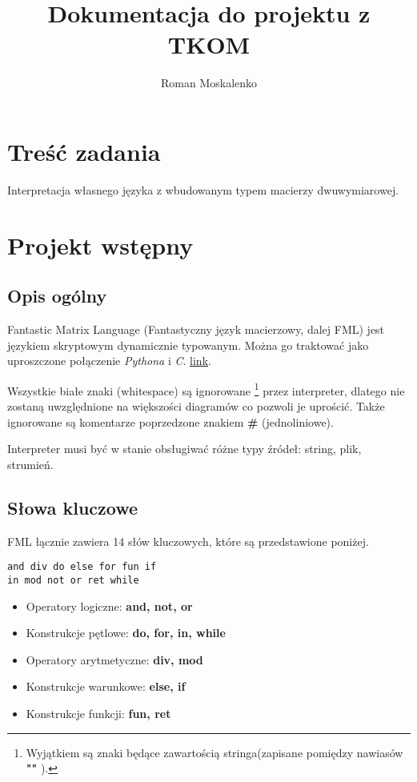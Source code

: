 \documentclass[12pt,a4paper]{article}
\title{Dokumentacja do projektu z TKOM}
\author{Roman Moskalenko}
\date{}
\begin{document}
\maketitle
\tableofcontents
\pagebreak

\section{Treść zadania}
Interpretacja własnego języka z wbudowanym typem macierzy dwuwymiarowej.

\section{Projekt wstępny}
\subsection{Opis ogólny}

Fantastic Matrix Language (Fantastyczny język macierzowy, dalej FML) jest językiem skryptowym dynamicznie typowanym. Można go traktować jako uproszczone połączenie \emph{Pythona} i \emph{C}. \hyperlink{foo}{\hypertarget{foo_back}{link}}.

Wszystkie białe znaki (whitespace) są ignorowane
\footnote{Wyjątkiem są znaki będące zawartością stringa(zapisane pomiędzy nawiasów \textbf{"" }).}
 przez interpreter, dlatego nie zostaną uwzględnione na większości diagramów co pozwoli je uprościć. Także ignorowane są komentarze poprzedzone znakiem \textbf{\#} (jednoliniowe).

Interpreter musi być w stanie obsługiwać różne typy źródeł: string, plik, strumień.


%
%
\subsection{Słowa kluczowe}

FML łącznie zawiera 14 słów kluczowych, które są przedstawione poniżej.

\begin{lstlisting}
and div do else for fun if 
in mod not or ret while
\end{lstlisting}

\begin{itemize}
\item Operatory logiczne: \textbf{and, not, or}

\item Konstrukcje pętlowe: \textbf{do, for, in, while}

\item Operatory arytmetyczne: \textbf{div, mod}

\item Konstrukcje warunkowe: \textbf{else, if}

\item Konstrukcje funkcji: \textbf{fun, ret}

\end{itemize}
\pagebreak
\end{document}
